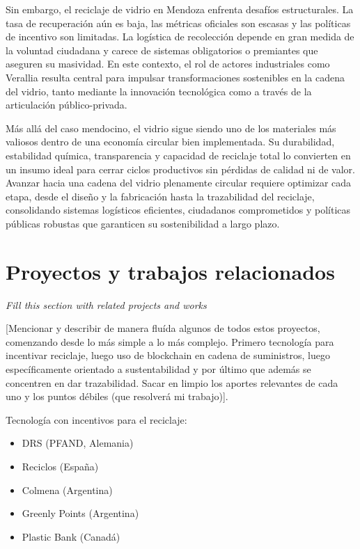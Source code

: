 Sin embargo, el reciclaje de vidrio en Mendoza enfrenta desafíos estructurales. La tasa de recuperación aún es baja, las métricas oficiales son escasas y las políticas de incentivo son limitadas. La logística de recolección depende en gran medida de la voluntad ciudadana y carece de sistemas obligatorios o premiantes que aseguren su masividad. En este contexto, el rol de actores industriales como Verallia resulta central para impulsar transformaciones sostenibles en la cadena del vidrio, tanto mediante la innovación tecnológica como a través de la articulación público-privada.

Más allá del caso mendocino, el vidrio sigue siendo uno de los materiales más valiosos dentro de una economía circular bien implementada. Su durabilidad, estabilidad química, transparencia y capacidad de reciclaje total lo convierten en un insumo ideal para cerrar ciclos productivos sin pérdidas de calidad ni de valor. Avanzar hacia una cadena del vidrio plenamente circular requiere optimizar cada etapa, desde el diseño y la fabricación hasta la trazabilidad del reciclaje, consolidando sistemas logísticos eficientes, ciudadanos comprometidos y políticas públicas robustas que garanticen su sostenibilidad a largo plazo.

\section{Proyectos y trabajos relacionados}


\begin{block}[todo]
    \textit{Fill this section with related projects and works}
\end{block}

[Mencionar y describir de manera fluída algunos de todos estos proyectos, comenzando desde lo más simple a lo más complejo. Primero tecnología para incentivar reciclaje, luego uso de blockchain en cadena de suministros, luego específicamente orientado a sustentabilidad y por último que además se concentren en dar trazabilidad. Sacar en limpio los aportes relevantes de cada uno y los puntos débiles (que resolverá mi trabajo)].

Tecnología con incentivos para el reciclaje:
\begin{itemize}
    \item DRS (PFAND, Alemania)
    \item Reciclos (España)
    \item Colmena (Argentina)
    \item Greenly Points (Argentina)
    \item Plastic Bank (Canadá)
\end{itemize}

